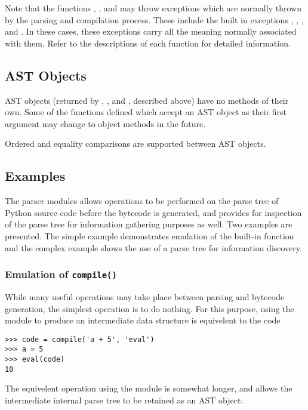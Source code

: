 Note that the functions , , and
 may throw exceptions which are normally thrown by the
parsing and compilation process.  These include the built in
exceptions , ,
, and .  In these cases, these
exceptions carry all the meaning normally associated with them.  Refer
to the descriptions of each function for detailed information.


\subsection{AST Objects}

AST objects (returned by , , and
, described above) have no methods of their own.
Some of the functions defined which accept an AST object as their
first argument may change to object methods in the future.

Ordered and equality comparisons are supported between AST objects.


\subsection{Examples}

The parser modules allows operations to be performed on the parse tree
of Python source code before the bytecode is generated, and provides
for inspection of the parse tree for information gathering purposes as
well.  Two examples are presented.  The simple example demonstrates
emulation of the  built-in function and the complex
example shows the use of a parse tree for information discovery.

\subsubsection{Emulation of {\tt compile()}}

While many useful operations may take place between parsing and
bytecode generation, the simplest operation is to do nothing.  For
this purpose, using the  module to produce an
intermediate data structure is equivelent to the code

\begin{verbatim}
>>> code = compile('a + 5', 'eval')
>>> a = 5
>>> eval(code)
10
\end{verbatim}

The equivelent operation using the  module is somewhat
longer, and allows the intermediate internal parse tree to be retained
as an AST object:

